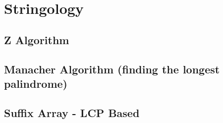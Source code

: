 \section{Stringology}

\subsection{Z Algorithm} 



\subsection{Manacher Algorithm (finding the longest palindrome)} 





%

\subsection{Suffix Array - LCP Based}


